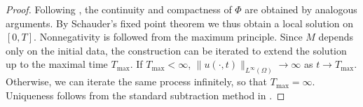 \documentclass{article}
\begin{document}
\begin{proof}
       Following \cite{Choi2025DW, Jin2018}, the continuity and compactness of $\Phi$ are obtained by analogous arguments.
        By Schauder's fixed point theorem we thus obtain a local solution on $[0,T]$. Nonnegativity is followed from the maximum principle. Since $M$ depends only on the initial data, the construction can be iterated to extend the solution up to the maximal time $T_{\max}$. If $T_{\max}<\infty$, $\|u(\cdot,t)\|_{L^\infty(\Omega)}\to \infty$ as $t\to T_{\max}$. Otherwise, we can iterate the same process infinitely, so that $T_{\max}=\infty$.
        Uniqueness follows from the standard subtraction method in \cite{Choi2025DW,Jin2018}.

\end{proof}
\end{document}

